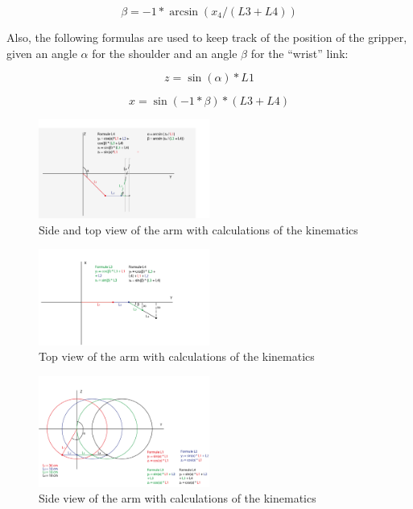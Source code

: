 \documentclass[project_eva.tex]{subfiles}
\begin{document}
\begin{equation*}
\beta = -1 * \arcsin(x_4/(L3 + L4))
\end{equation*}

Also, the following formulas are used to keep track of the position of the gripper, given an angle $\alpha$ for the 
shoulder and an angle $\beta$ for the ``wrist'' link:

\begin{equation*}
z = \sin(\alpha)*L1
\end{equation*}

\begin{equation*}
x = \sin(-1 * \beta)*(L3 + L4)
\end{equation*}

\begin{figure}[h]
	\centering
	\mbox{\includegraphics[width=0.5\textwidth]{Images/3d_zijenbovenaanzicht.png}}
	\caption{Side and top view of the arm with calculations of the kinematics}
	\label{fig:IK0}
\end{figure}

\begin{figure}[h]
	\centering
	\mbox{\includegraphics[width=0.5\textwidth]{Images/2d_bovenaanzicht.png}}
	\caption{Top view of the arm with calculations of the kinematics}
	\label{fig:IK1}
\end{figure}

\begin{figure}[h!]
	\centering
	\mbox{\includegraphics[width=0.5\textwidth]{Images/2d_zijaanzicht.png}}
	\caption{Side view of the arm with calculations of the kinematics}
	\label{fig:IK2}
\end{figure}
\end{document}
